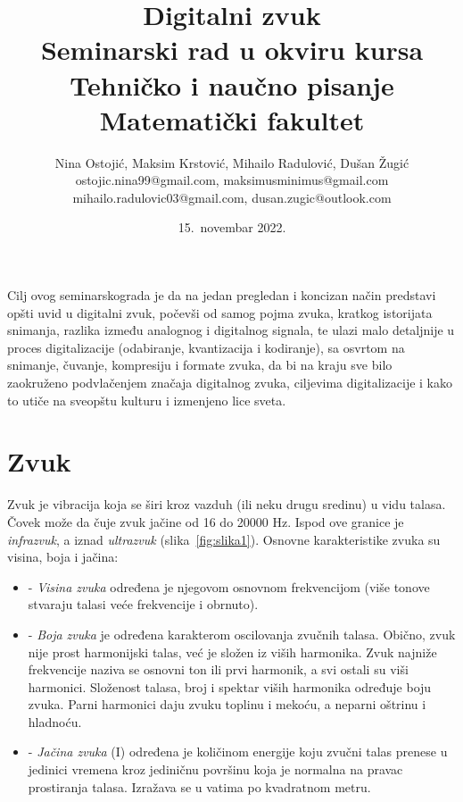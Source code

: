 \documentclass[a4paper]{article}
\begin{document}
\title{Digitalni zvuk\\ \small{Seminarski rad u okviru kursa\\Tehničko i naučno pisanje\\ Matematički fakultet}}

\author{Nina Ostojić, Maksim Krstović, Mihailo Radulović, Dušan Žugić\\ostojic.nina99@gmail.com, maksimusminimus@gmail.com\\ mihailo.radulovic03@gmail.com, dusan.zugic@outlook.com}
\date{15.~novembar 2022.}
\maketitle

\abstract
Cilj ovog seminarskograda je da na jedan pregledan i koncizan način predstavi opšti uvid u digitalni zvuk, počevši od samog pojma zvuka, kratkog istorijata snimanja, razlika između analognog i digitalnog signala, te ulazi malo detaljnije u proces digitalizacije (odabiranje, kvantizacija i kodiranje), sa osvrtom na snimanje, čuvanje, kompresiju i formate zvuka, da bi na kraju sve bilo zaokruženo podvlačenjem značaja digitalnog zvuka, ciljevima digitalizacije i kako to utiče na sveopštu kulturu i izmenjeno lice sveta.

\tableofcontents

\newpage

\section{Zvuk}

    Zvuk je vibracija koja se širi kroz vazduh (ili neku drugu sredinu) u vidu talasa. Čovek može da čuje zvuk jačine od 16 do 20000 Hz. Ispod ove granice je \textit{infrazvuk}, a iznad \textit{ultrazvuk} (slika~\ref{fig:slika1}). Osnovne karakteristike zvuka su visina, boja i jačina:
    \begin {itemize}
        \item[-] \textit{Visina zvuka} određena je njegovom osnovnom frekvencijom (više tonove stvaraju talasi
        veće frekvencije i obrnuto).
    
        \item[-] \textit{Boja zvuka} je određena karakterom oscilovanja zvučnih talasa. Obično, zvuk nije prost
        harmonijski talas, već je složen iz viših harmonika. Zvuk najniže frekvencije naziva se osnovni ton ili prvi harmonik, a svi ostali su viši harmonici. Složenost talasa, broj i spektar viših
        harmonika određuje boju zvuka. Parni harmonici daju zvuku toplinu i mekoću, a neparni
        oštrinu i hladnoću.
    
        \item[-] \textit{Jačina zvuka} (I) određena je količinom energije koju zvučni talas prenese u jedinici
        vremena kroz jediničnu površinu koja je normalna na pravac prostiranja talasa. Izražava se
        u vatima po kvadratnom metru\cite{10.17632/rwbs7645hg.n}.
    \end{itemize}
  
\end{document}

